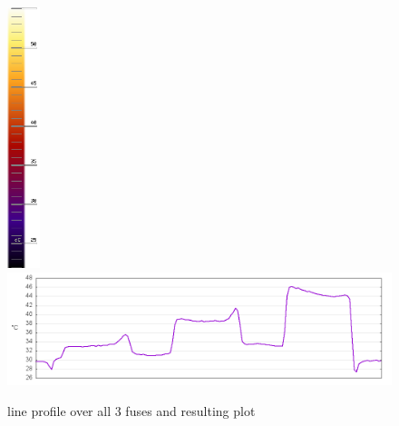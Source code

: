 \documentclass[12pt,twoside,a4paper,titlepage]{report}
\begin{document}
\begin{figure}[ht]
 \includegraphics[width=9.5mm, keepaspectratio=true width=10cm]{img/FLIR_P60_orig_scale}
 \includegraphics[width=14cm, keepaspectratio=true width=10cm]{img/FLIR_P60_hl_line_gnuplot}
 \caption{line profile over all 3 fuses and resulting plot}
 \label{fig:tools-export-line}
\end{figure}
\end{document}
